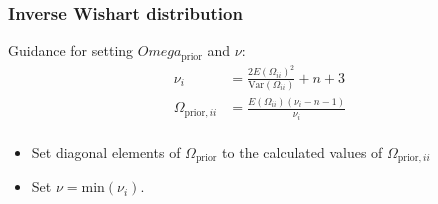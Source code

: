 \documentclass[handout]{beamer}
\begin{document}
\begin{frame}
  \frametitle{Inverse Wishart distribution}

Guidance for setting $Omega_\text{prior}$ and $\nu$:
\begin{align*}
  \nu_i &=
  \frac{2E\left(\Omega_{ii}\right)^2}{\text{Var}\left(\Omega_{ii}\right)} + n
  + 3 \\
\Omega_{\text{prior},ii} &= \frac{E\left(\Omega_{ii}\right)\left(\nu_i - n -
                          1\right)}{\nu_i} \\
\end{align*}
\begin{itemize}
\item Set diagonal elements of $\Omega_\text{prior}$ to the calculated values
of $\Omega_{\text{prior},ii}$
\item Set $\nu = \text{min}\left(\nu_i\right)$.
\end{itemize}

\end{frame}


  
\end{document}
